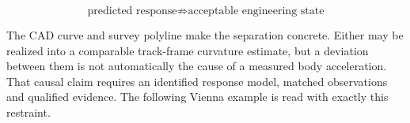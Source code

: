 \[
\boxed{\text{predicted response}
\not\Rightarrow \text{acceptable engineering state}}
\]

The CAD curve and survey polyline make the separation concrete. Either may be
realized into a comparable track-frame curvature estimate, but a deviation
between them is not automatically the cause of a measured body acceleration.
That causal claim requires an identified response model, matched observations
and qualified evidence. The following Vienna example is read with exactly
this restraint.
